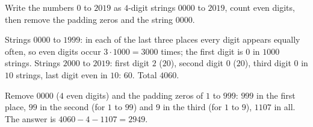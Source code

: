 Write the numbers $0$ to $2019$ as $4$-digit strings $0000$ to $2019$, count even digits, then remove the padding zeros and the string $0000$.

Strings $0000$ to $1999$: in each of the last three places every digit appears equally often, so even digits occur $3\cdot1000=3000$ times; the first digit is $0$ in $1000$ strings. Strings $2000$ to $2019$: first digit $2$ ($20$), second digit $0$ ($20$), third digit $0$ in $10$ strings, last digit even in $10$: $60$. Total $4060$.

Remove $0000$ ($4$ even digits) and the padding zeros of $1$ to $999$: $999$ in the first place, $99$ in the second (for $1$ to $99$) and $9$ in the third (for $1$ to $9$), $1107$ in all. The answer is $4060-4-1107=\boxed{2949}$.
